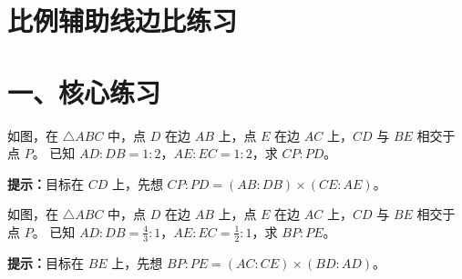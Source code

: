 \documentclass{exam-zh}
\begin{document}
\section*{比例辅助线边比练习}

\section*{一、核心练习}


\begin{problem}[points=10]
  \noindent
  \begin{minipage}[t]{\dimexpr\linewidth-60mm-6mm\relax}
    \vspace{0pt}
    如图，在 $\triangle ABC$ 中，点 $D$ 在边 $AB$ 上，点 $E$ 在边 $AC$ 上，$CD$ 与 $BE$ 相交于点 $P$。
已知 $AD:DB=1:2$，$AE:EC=1:2$，求 $CP:PD$。

    \begin{hintbox}
\textbf{提示：}目标在 $CD$ 上，先想 $CP:PD=(AB:DB)\times(CE:AE)$。\end{hintbox}

  \end{minipage}\hfill
  \begin{diagramcoltikz}{60mm}{第 1 题图}
  }
  \end{diagramcoltikz}
  \par\medskip
  \answerarea[45mm]
\end{problem}



\begin{problem}[points=10]
  \noindent
  \begin{minipage}[t]{\dimexpr\linewidth-60mm-6mm\relax}
    \vspace{0pt}
    如图，在 $\triangle ABC$ 中，点 $D$ 在边 $AB$ 上，点 $E$ 在边 $AC$ 上，$CD$ 与 $BE$ 相交于点 $P$。
已知 $AD:DB=\frac{4}{3}:1$，$AE:EC=\frac{1}{2}:1$，求 $BP:PE$。

    \begin{hintbox}
\textbf{提示：}目标在 $BE$ 上，先想 $BP:PE=(AC:CE)\times(BD:AD)$。\end{hintbox}

  \end{minipage}\hfill
  \begin{diagramcoltikz}{60mm}{第 2 题图}
  }
  \end{diagramcoltikz}
  \par\medskip
  \answerarea[45mm]
\end{problem}
\end{document}
